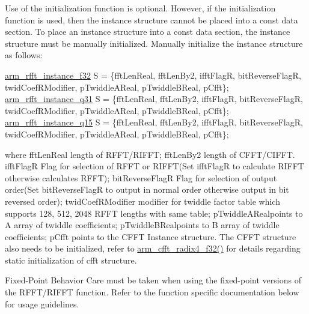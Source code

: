 \begin{DoxyParagraph}{}
Use of the initialization function is optional. However, if the initialization function is used, then the instance structure cannot be placed into a const data section. To place an instance structure into a const data section, the instance structure must be manually initialized. Manually initialize the instance structure as follows\-: 
\begin{DoxyPre}   
\hyperlink{structarm__rfft__instance__f32}{arm\_rfft\_instance\_f32} S = \{fftLenReal, fftLenBy2, ifftFlagR, bitReverseFlagR, twidCoefRModifier, pTwiddleAReal, pTwiddleBReal, pCfft\};   
\hyperlink{structarm__rfft__instance__q31}{arm\_rfft\_instance\_q31} S = \{fftLenReal, fftLenBy2, ifftFlagR, bitReverseFlagR, twidCoefRModifier, pTwiddleAReal, pTwiddleBReal, pCfft\};   
\hyperlink{structarm__rfft__instance__q15}{arm\_rfft\_instance\_q15} S = \{fftLenReal, fftLenBy2, ifftFlagR, bitReverseFlagR, twidCoefRModifier, pTwiddleAReal, pTwiddleBReal, pCfft\};   
 \end{DoxyPre}
 where {\ttfamily fft\-Len\-Real} length of R\-F\-F\-T/\-R\-I\-F\-F\-T; {\ttfamily fft\-Len\-By2} length of C\-F\-F\-T/\-C\-I\-F\-F\-T. {\ttfamily ifft\-Flag\-R} Flag for selection of R\-F\-F\-T or R\-I\-F\-F\-T(\-Set ifft\-Flag\-R to calculate R\-I\-F\-F\-T otherwise calculates R\-F\-F\-T); {\ttfamily bit\-Reverse\-Flag\-R} Flag for selection of output order(\-Set bit\-Reverse\-Flag\-R to output in normal order otherwise output in bit reversed order); {\ttfamily twid\-Coef\-R\-Modifier} modifier for twiddle factor table which supports 128, 512, 2048 R\-F\-F\-T lengths with same table; {\ttfamily p\-Twiddle\-A\-Real}points to A array of twiddle coefficients; {\ttfamily p\-Twiddle\-B\-Real}points to B array of twiddle coefficients; {\ttfamily p\-Cfft} points to the C\-F\-F\-T Instance structure. The C\-F\-F\-T structure also needs to be initialized, refer to \hyperlink{group___c_f_f_t___c_i_f_f_t_ga521f670cd9c571bc61aff9bec89f4c26}{arm\-\_\-cfft\-\_\-radix4\-\_\-f32()} for details regarding static initialization of cfft structure.
\end{DoxyParagraph}
\begin{DoxyParagraph}{Fixed-\/\-Point Behavior }
Care must be taken when using the fixed-\/point versions of the R\-F\-F\-T/\-R\-I\-F\-F\-T function. Refer to the function specific documentation below for usage guidelines. 
\end{DoxyParagraph}


